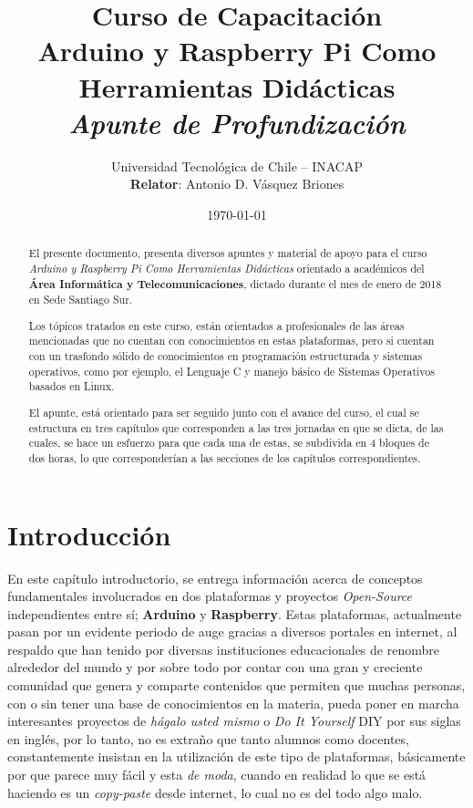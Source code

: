 \documentclass[letterpaper, 10pt]{report}
\title{\textbf{Curso de Capacitación}\\Arduino y Raspberry Pi Como Herramientas Didácticas\\ \textit{Apunte de Profundización}}
\author{Universidad Tecnológica de Chile -- INACAP\\
\textbf{Relator}: Antonio D. Vásquez Briones}
\date{\today}
\begin{document}
	\maketitle
	\tableofcontents
	
\begin{abstract}
	El presente documento, presenta diversos apuntes y material de apoyo para el curso \emph{Arduino y Raspberry Pi Como Herramientas Didácticas} orientado a académicos del \textbf{Área Informática y Telecomunicaciones}, dictado durante el mes de enero de 2018 en Sede Santiago Sur.
	
	Los tópicos tratados en este curso, están orientados a profesionales de las áreas mencionadas que no cuentan con conocimientos en estas plataformas, pero si cuentan con un trasfondo sólido de conocimientos en programación estructurada y sistemas operativos, como por ejemplo, el Lenguaje C y manejo básico de Sistemas Operativos basados en Linux.
	
	El apunte, está orientado para ser seguido junto con el avance del curso, el cual se estructura en tres capítulos que corresponden a las tres jornadas en que se dicta, de las cuales, se hace un esfuerzo para que cada una de estas, se subdivida en 4 bloques de dos horas, lo que corresponderían a las secciones de los capítulos correspondientes.
	
\end{abstract}
	
\chapter{Introducción}

\setlength{\parskip}{\baselineskip}
En este capítulo introductorio, se entrega información acerca de conceptos fundamentales involucrados en dos plataformas y proyectos \emph{Open-Source} independientes entre sí; {\bf Arduino} y {\bf Raspberry}. Estas plataformas, actualmente pasan por un evidente periodo de auge gracias a diversos portales en internet, al respaldo que han tenido por diversas instituciones educacionales de renombre alrededor del mundo y por sobre todo por contar con una gran y creciente comunidad que genera y comparte contenidos que permiten que muchas personas, con o sin tener una base de conocimientos en la materia, pueda poner en marcha interesantes proyectos de \emph{hágalo usted mismo} o \emph{Do It Yourself} DIY por sus siglas en inglés, por lo tanto, no es extraño que tanto  alumnos como docentes, constantemente insistan en la utilización de este tipo de plataformas, básicamente por que parece muy fácil y esta \emph{de moda}, cuando en realidad lo que se está haciendo es un \emph{copy-paste} desde internet, lo cual no es del todo algo malo. 
\end{document}
